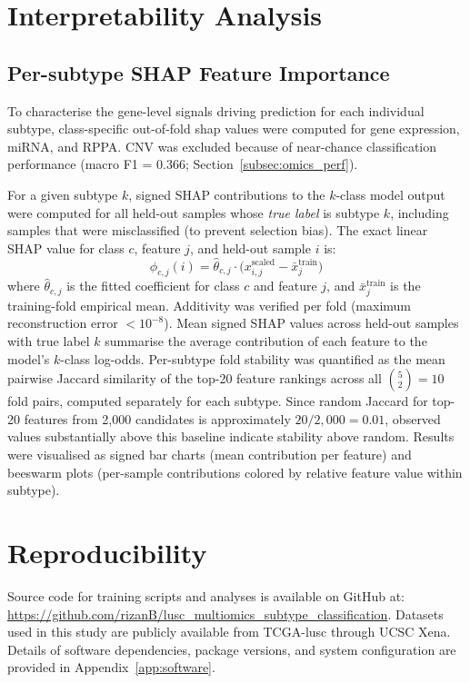 \section{Interpretability Analysis}
\label{sec:interpretability_method}

\subsection{Per-subtype SHAP Feature Importance}
\label{subsec:per_subtype_shap}

To characterise the gene-level signals driving prediction for each individual subtype, class-specific out-of-fold \gls{shap} values \parencite{Lundberg2017} were computed for gene expression, miRNA, and RPPA. CNV was excluded because of near-chance classification performance (macro F1 = 0.366; Section~\ref{subsec:omics_perf}).

For a given subtype $k$, signed SHAP contributions to the $k$-class model output were computed for all held-out samples whose \emph{true label} is subtype $k$, including samples that were misclassified (to prevent selection bias). The exact linear SHAP value for class $c$, feature $j$, and held-out sample $i$ is:
\[
\phi_{c,j}(i) = \hat{\theta}_{c,j} \cdot \bigl(x^{\text{scaled}}_{i,j} - \bar{x}^{\text{train}}_{j}\bigr)
\]
where $\hat{\theta}_{c,j}$ is the fitted coefficient for class $c$ and feature $j$, and $\bar{x}^{\text{train}}_{j}$ is the training-fold empirical mean. Additivity was verified per fold (maximum reconstruction error $< 10^{-8}$). Mean signed SHAP values across held-out samples with true label $k$ summarise the average contribution of each feature to the model's $k$-class log-odds. Per-subtype fold stability was quantified as the mean pairwise Jaccard similarity of the top-20 feature rankings across all $\binom{5}{2} = 10$ fold pairs, computed separately for each subtype. Since random Jaccard for top-20 features from 2,000 candidates is approximately $20/2,000 = 0.01$, observed values substantially above this baseline indicate stability above random. Results were visualised as signed bar charts (mean contribution per feature) and beeswarm plots (per-sample contributions colored by relative feature value within subtype).

\section{Reproducibility}

Source code for training scripts and analyses is available on GitHub at: \url{https://github.com/rizanB/lusc_multiomics_subtype_classification}. Datasets used in this study are publicly available from TCGA-\gls{lusc} through UCSC Xena. Details of software dependencies, package versions, and system configuration are provided in Appendix~\ref{app:software}.


